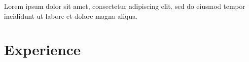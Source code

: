 \documentclass[11pt]{article}
\newcommand{\displayfullname}{%
    \begin{center}
    {\fontsize{\namefontsize}{\dimexpr1.2\namefontsize}\selectfont\fullname}
    \end{center}
    \namesep %
}
\newcommand{\displaycontactinfo}{%
  \begin{center}
    \ifthenelse{\isundefined{\mylocation}}{}{%
        \mylocation\separator
    }%
    \ifthenelse{\isundefined{\mytel}}{}{%
        \mytel\separator
    }%
    \ifthenelse{\isundefined{\myemail}}{}{%
        \myemail\separator
    }%
    \ifthenelse{\isundefined{\mygithub}}{}{%
        \mygithub\separator
    }%
    \ifthenelse{\isundefined{\mylinkedin}}{}{%
        \mylinkedin
    }%
    \end{center}
}
\newcommand{\namefontsize}{14pt}
\newcommand{\namesep}{\vspace{0.5em}}
\newcommand{\separator}{\ | \ }
\begin{document}
\displayfullname
\displaycontactinfo

\vspace{0.75em}

Lorem ipsum dolor sit amet, consectetur adipiscing elit, sed do eiusmod tempor incididunt ut labore et dolore magna aliqua.

\vspace{0.75em}

\section*{Experience}

\newpage
\layout*
\end{document}
